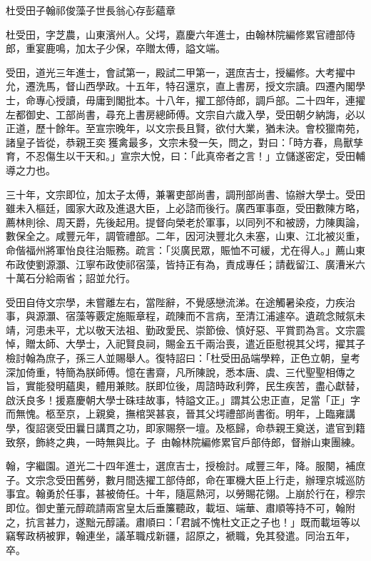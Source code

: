 
\begin{pinyinscope}
杜受田子翰祁俊藻子世長翁心存彭蘊章

杜受田，字芝農，山東濱州人。父堮，嘉慶六年進士，由翰林院編修累官禮部侍郎，重宴鹿鳴，加太子少保，卒贈太傅，謚文端。

受田，道光三年進士，會試第一，殿試二甲第一，選庶吉士，授編修。大考擢中允，遷洗馬，督山西學政。十五年，特召還京，直上書房，授文宗讀。四遷內閣學士，命專心授讀，毋庸到閣批本。十八年，擢工部侍郎，調戶部。二十四年，連擢左都御史、工部尚書，尋充上書房總師傅。文宗自六歲入學，受田朝夕納誨，必以正道，歷十餘年。至宣宗晚年，以文宗長且賢，欲付大業，猶未決。會校獵南苑，諸皇子皆從，恭親王奕獲禽最多，文宗未發一矢，問之，對曰：「時方春，鳥獸孳育，不忍傷生以干天和。」宣宗大悅，曰：「此真帝者之言！」立儲遂密定，受田輔導之力也。

三十年，文宗即位，加太子太傅，兼署吏部尚書，調刑部尚書、協辦大學士。受田雖未入樞廷，國家大政及進退大臣，上必諮而後行。廣西軍事亟，受田數陳方略，薦林則徐、周天爵，先後起用。提督向榮老於軍事，以同列不和被謗，力陳輿論，數保全之。咸豐元年，調管禮部。二年，因河決豐北久未塞，山東、江北被災重，命偕福州將軍怡良往治賑務。疏言：「災廣民眾，賑恤不可緩，尤在得人。」薦山東布政使劉源灝、江寧布政使祁宿藻，皆持正有為，責成專任；請截留江、廣漕米六十萬石分給兩省；詔並允行。

受田自侍文宗學，未嘗離左右，當陛辭，不覺感戀流涕。在途觸暑染疫，力疾治事，與源灝、宿藻等覈定施賑章程，疏陳而不言病，至清江浦遽卒。遺疏念賊氛未靖，河患未平，尤以敬天法祖、勤政愛民、崇節儉、慎好惡、平賞罰為言。文宗震悼，贈太師、大學士，入祀賢良祠，賜金五千兩治喪，遣近臣慰視其父堮，擢其子檢討翰為庶子，孫三人並賜舉人。復特詔曰：「杜受田品端學粹，正色立朝，皇考深加倚重，特簡為朕師傅。憶在書齋，凡所陳說，悉本唐、虞、三代聖聖相傳之旨，實能發明蘊奧，體用兼賅。朕即位後，周諮時政利弊，民生疾苦，盡心獻替，啟沃良多！援嘉慶朝大學士硃珪故事，特謚文正。」謂其公忠正直，足當「正」字而無愧。柩至京，上親奠，撫棺哭甚哀，晉其父堮禮部尚書銜。明年，上臨雍講學，復詔褒受田曩日講貫之功，即家賜祭一壇。及柩歸，命恭親王奠送，遣官到籍致祭，飾終之典，一時無與比。子，由翰林院編修累官戶部侍郎，督辦山東團練。

翰，字繼園。道光二十四年進士，選庶吉士，授檢討。咸豐三年，降。服闋，補庶子。文宗念受田舊勞，數月間迭擢工部侍郎，命在軍機大臣上行走，辦理京城巡防事宜。翰勇於任事，甚被倚任。十年，隨扈熱河，以勞賜花翎。上崩於行在，穆宗即位。御史董元醇疏請兩宮皇太后垂簾聽政，載垣、端華、肅順等持不可，翰附之，抗言甚力，遂黜元醇議。肅順曰：「君誠不愧杜文正之子也！」既而載垣等以竊奪政柄被罪，翰連坐，議革職戍新疆，詔原之，褫職，免其發遣。同治五年，卒。


\end{pinyinscope}
